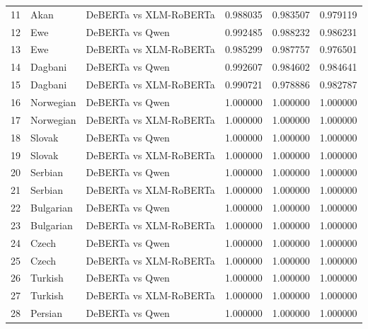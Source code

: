 \documentclass[11pt]{article} %
\begin{document}
\begin{table}
\begin{tabular}{lllrrr}
            11         & Akan       & DeBERTa vs XLM-RoBERTa & 0.988035    & 0.983507    & 0.979119    \\
            12         & Ewe        & DeBERTa vs Qwen        & 0.992485    & 0.988232    & 0.986231    \\
            13         & Ewe        & DeBERTa vs XLM-RoBERTa & 0.985299    & 0.987757    & 0.976501    \\
            14         & Dagbani    & DeBERTa vs Qwen        & 0.992607    & 0.984602    & 0.984641    \\
            15         & Dagbani    & DeBERTa vs XLM-RoBERTa & 0.990721    & 0.978886    & 0.982787    \\
            16         & Norwegian  & DeBERTa vs Qwen        & 1.000000    & 1.000000    & 1.000000    \\
            17         & Norwegian  & DeBERTa vs XLM-RoBERTa & 1.000000    & 1.000000    & 1.000000    \\
            18         & Slovak     & DeBERTa vs Qwen        & 1.000000    & 1.000000    & 1.000000    \\
            19         & Slovak     & DeBERTa vs XLM-RoBERTa & 1.000000    & 1.000000    & 1.000000    \\
            20         & Serbian    & DeBERTa vs Qwen        & 1.000000    & 1.000000    & 1.000000    \\
            21         & Serbian    & DeBERTa vs XLM-RoBERTa & 1.000000    & 1.000000    & 1.000000    \\
            22         & Bulgarian  & DeBERTa vs Qwen        & 1.000000    & 1.000000    & 1.000000    \\
            23         & Bulgarian  & DeBERTa vs XLM-RoBERTa & 1.000000    & 1.000000    & 1.000000    \\
            24         & Czech      & DeBERTa vs Qwen        & 1.000000    & 1.000000    & 1.000000    \\
            25         & Czech      & DeBERTa vs XLM-RoBERTa & 1.000000    & 1.000000    & 1.000000    \\
            26         & Turkish    & DeBERTa vs Qwen        & 1.000000    & 1.000000    & 1.000000    \\
            27         & Turkish    & DeBERTa vs XLM-RoBERTa & 1.000000    & 1.000000    & 1.000000    \\
            28         & Persian    & DeBERTa vs Qwen        & 1.000000    & 1.000000    & 1.000000    \\

\end{tabular}
\end{table}
\end{document}
